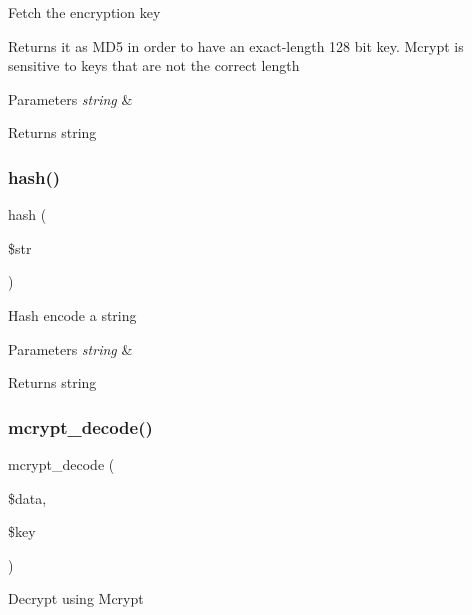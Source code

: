 Fetch the encryption key

Returns it as M\+D5 in order to have an exact-\/length 128 bit key. Mcrypt is sensitive to keys that are not the correct length


\begin{DoxyParams}{Parameters}
{\em string} & \\
\hline
\end{DoxyParams}
\begin{DoxyReturn}{Returns}
string 
\end{DoxyReturn}
\mbox{\label{class_c_i___encrypt_aea8db0058c00fd2bc1351ddb2ebf3191}} 
\subsubsection{\texorpdfstring{hash()}{hash()}}
{\footnotesize\ttfamily hash (\begin{DoxyParamCaption}\item[{}]{\$str }\end{DoxyParamCaption})}

Hash encode a string


\begin{DoxyParams}{Parameters}
{\em string} & \\
\hline
\end{DoxyParams}
\begin{DoxyReturn}{Returns}
string 
\end{DoxyReturn}
\mbox{\label{class_c_i___encrypt_a85f02c928abbbc5a6bf038ea5292324d}} 
\subsubsection{\texorpdfstring{mcrypt\+\_\+decode()}{mcrypt\_decode()}}
{\footnotesize\ttfamily mcrypt\+\_\+decode (\begin{DoxyParamCaption}\item[{}]{\$data,  }\item[{}]{\$key }\end{DoxyParamCaption})}

Decrypt using Mcrypt


